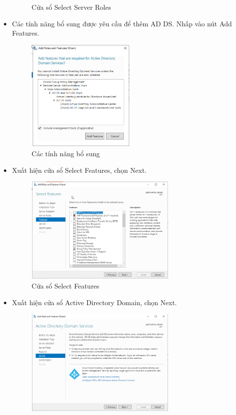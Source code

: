 \documentclass[13pt]{report}
\begin{document}
\begin{itemize}
\begin{figure}[htp]
			\caption{Cửa sổ Select Server Roles}
		\end{figure}
		\newpage
		\item Các tính năng bổ sung được yêu cầu để thêm AD DS. Nhấp vào nút Add Features.
		\begin{figure}[htp]
			\centering
			\includegraphics[width=0.5\textwidth]{image/Gui/ADDC/6.png}
			\caption{Các tính năng bổ sung}
		\end{figure}
		\item Xuất hiện cửa sổ Select Features, chọn Next.
		\begin{figure}[htp]
			\centering
			\includegraphics[width=0.7\textwidth]{image/Gui/ADDC/7.png}
			\caption{Cửa sổ Select Features}
		\end{figure}
		\newpage
		\item Xuất hiện cửa sổ Active Directory Domain, chọn Next.
		\begin{figure}[htp]
			\centering
			\includegraphics[width=0.7\textwidth]{image/Gui/ADDC/8.png}

\end{figure}
\end{itemize}
\end{document}
